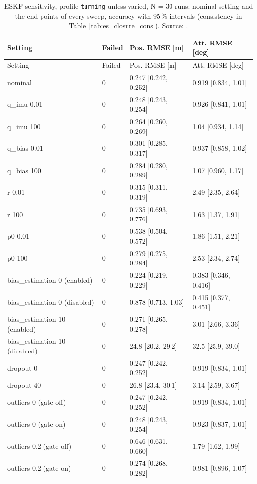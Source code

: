{\scriptsize
\begin{longtable}{llll}
\caption{ESKF sensitivity, profile \texttt{turning} unless varied, N = 30 runs: nominal setting and the end points of every sweep, accuracy with 95\,\% intervals (consistency in Table~\ref{tab:es_closure_cons}). Source: .}\label{tab:es_closure}\\
\toprule
Setting & Failed & Pos. RMSE [m] & Att. RMSE [deg] \\
\midrule
\endfirsthead
\toprule
Setting & Failed & Pos. RMSE [m] & Att. RMSE [deg] \\
\midrule
\endhead
nominal & 0 & 0.247 [0.242, 0.252] & 0.919 [0.834, 1.01] \\
q\_imu 0.01 & 0 & 0.248 [0.243, 0.254] & 0.926 [0.841, 1.01] \\
q\_imu 100 & 0 & 0.264 [0.260, 0.269] & 1.04 [0.934, 1.14] \\
q\_bias 0.01 & 0 & 0.301 [0.285, 0.317] & 0.937 [0.858, 1.02] \\
q\_bias 100 & 0 & 0.284 [0.280, 0.289] & 1.07 [0.960, 1.17] \\
r 0.01 & 0 & 0.315 [0.311, 0.319] & 2.49 [2.35, 2.64] \\
r 100 & 0 & 0.735 [0.693, 0.776] & 1.63 [1.37, 1.91] \\
p0 0.01 & 0 & 0.538 [0.504, 0.572] & 1.86 [1.51, 2.21] \\
p0 100 & 0 & 0.279 [0.275, 0.284] & 2.53 [2.34, 2.74] \\
bias\_estimation 0 (enabled) & 0 & 0.224 [0.219, 0.229] & 0.383 [0.346, 0.416] \\
bias\_estimation 0 (disabled) & 0 & 0.878 [0.713, 1.03] & 0.415 [0.377, 0.451] \\
bias\_estimation 10 (enabled) & 0 & 0.271 [0.265, 0.278] & 3.01 [2.66, 3.36] \\
bias\_estimation 10 (disabled) & 0 & 24.8 [20.2, 29.2] & 32.5 [25.9, 39.0] \\
dropout 0 & 0 & 0.247 [0.242, 0.252] & 0.919 [0.834, 1.01] \\
dropout 40 & 0 & 26.8 [23.4, 30.1] & 3.14 [2.59, 3.67] \\
outliers 0 (gate off) & 0 & 0.247 [0.242, 0.252] & 0.919 [0.834, 1.01] \\
outliers 0 (gate on) & 0 & 0.248 [0.243, 0.254] & 0.923 [0.837, 1.01] \\
outliers 0.2 (gate off) & 0 & 0.646 [0.631, 0.660] & 1.79 [1.62, 1.99] \\
outliers 0.2 (gate on) & 0 & 0.274 [0.268, 0.282] & 0.981 [0.896, 1.07] \\

\end{longtable}}
